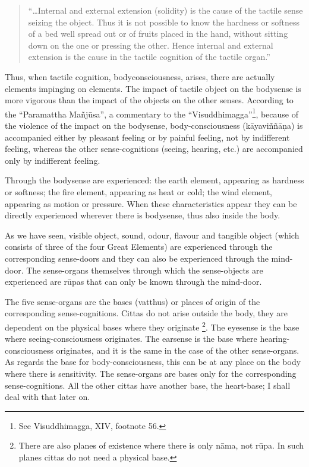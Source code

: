 \documentclass{book}
\begin{document}
\begin{quote}\begin{flushleft}
``\ldots Internal and external extension (solidity) is the cause of the
tactile sense seizing the object. Thus it is not possible to know the
hardness or softness of a bed well spread out or of fruits placed in
the hand, without sitting down on the one or pressing the other. Hence
internal and external extension is the cause in the tactile cognition
of the tactile organ.''
\end{flushleft}\end{quote}




Thus, when tactile cognition, bodyconsciousness, arises, there are
actually elements impinging on elements. The impact of tactile object
on the bodysense is more vigorous than the impact of the objects on the
other senses. According to the ``Paramattha Ma\~nj\=usa'', a commentary
to the ``Visuddhimagga''\footnote{See Visuddhimagga, XIV, footnote
56.}, because of the violence of the impact on the bodysense,
body-consciousness (k\=ayavi\~n\~n{\=a}\d na) is accompanied either by
pleasant feeling or by painful feeling, not by indifferent feeling,
whereas the other sense-cognitions (seeing, hearing, etc.) are
accompanied only by indifferent feeling. 

Through the bodysense are experienced: the earth element, appearing as
hardness or softness; the fire element, appearing as heat or cold; the
wind element, appearing as motion or pressure. When these
characteristics appear they can be directly experienced wherever there
is bodysense, thus also inside the body. 

As we have seen, visible object, sound, odour, flavour and tangible
object (which consists of three of the four Great Elements) are
experienced through the corresponding sense-doors and they can also
be experienced through the mind-door. The sense-organs themselves
through which the sense-objects are experienced are r\=upas that can
only be known through the mind-door.

The five sense-organs are the bases (vatthus) or places of origin of
the corresponding sense-cognitions. Cittas do not arise outside the
body, they are dependent on the physical bases where they originate
\footnote{There are also planes of existence where there is only
n{\=a}ma, not r\=upa. In such planes cittas do not need a physical
base. }. The eyesense is the base where seeing-consciousness
originates. The earsense is the base where hearing-consciousness
originates, and it is the same in the case of the other sense-organs. As regards the base for body-consc\-ious\-ness, this can be at any place on the body where there is sensitivity. The sense-organs are bases
only for the corresponding sense-cognitions. All the other cittas
have another base, the heart-base; I shall deal with that later on.
\end{document}
